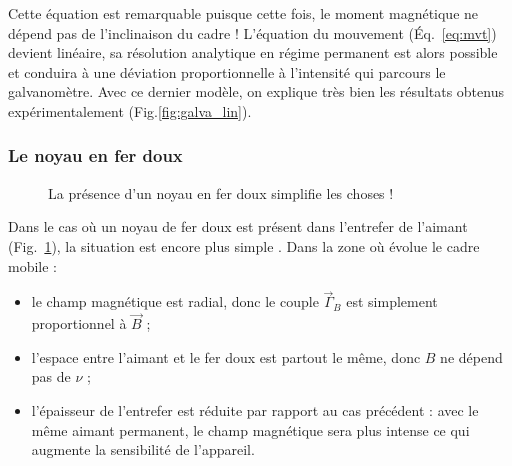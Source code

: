 \documentclass[12pt,a4paper,fleqn]{article}
\begin{document}
Cette équation est remarquable puisque cette fois, le moment magnétique ne dépend pas de l'inclinaison du cadre !
L'équation du mouvement (Éq.~\ref{eq:mvt}) devient linéaire, sa résolution analytique en régime permanent est alors possible et conduira à une déviation proportionnelle à l'intensité qui parcours le galvanomètre.
Avec ce dernier modèle, on explique très bien les résultats obtenus expérimentalement (Fig.\ref{fig:galva_lin}).

\subsubsection{Le noyau en fer doux}

\begin{figure}[htbp]
\center
{}
\caption{La présence d'un noyau en fer doux simplifie les choses !}
\label{fig:fer_doux}
\end{figure}

Dans le cas où un noyau de fer doux est présent dans l'entrefer de l'aimant (Fig.~\ref{fig:fer_doux}), la situation est encore plus simple \cite{moving_coil}.
Dans la zone où évolue le cadre mobile :
\begin{itemize}
\item le champ magnétique est radial, donc le couple $\vec{\Gamma}_B$ est simplement proportionnel à $\vec{B}$ ;
\item l'espace entre l'aimant et le fer doux est partout le même, donc $B$ ne dépend pas de $\nu$ ;
\item l'épaisseur de l'entrefer est réduite par rapport au cas précédent : avec le même aimant permanent, le champ magnétique sera plus intense ce qui augmente la sensibilité de l'appareil.
\end{itemize}
\end{document}

